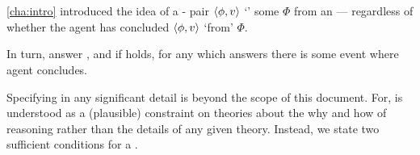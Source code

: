 \chapter{}
\label{cha:ros}


\begin{note}
  \autoref{cha:intro} introduced the idea of a - pair \(\langle\phi, v\rangle\) `\fingf{}' some \pool{} \(\Phi\) from an \agpe{} --- regardless of whether the agent has concluded \(\langle\phi, v\rangle\) `from' \(\Phi\).

  In turn,  answer \qWhy{}, and if \issueInclusion{} holds, for any \fingfr{} which answers \qWhy{} there is some event where agent concludes.

  Specifying \fingfr{} in any significant detail is beyond the scope of this document.
  For, \issueInclusion{} is understood as a (plausible) constraint on theories about the why and how of reasoning rather than the details of any given theory.
  Instead, we state two sufficient conditions for a \fingfr{}.
\end{note}


\section{\supportI{}}
\label{cha:ros:I}


